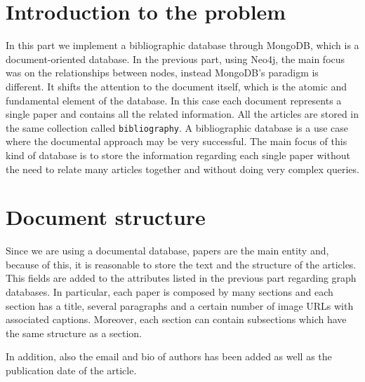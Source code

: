 \chapter{Introduction to the problem}
\label{ch:introduction_to_the_problem_mongodb}%
In this part we implement a bibliographic database through MongoDB, which is a document-oriented database.
In the previous part, using Neo4j, the main focus was on the relationships between nodes, instead MongoDB's paradigm is different.
It shifts the attention to the document itself, which is the atomic and fundamental element of the database.
In this case each document represents a single paper and contains all the related information.
All the articles are stored in the same collection called \verb|bibliography|.
A bibliographic database is a use case where the documental approach may be very successful.
The main focus of this kind of database is to store the information regarding each single paper without the need to relate many articles together and without doing very complex queries.


\chapter{Document structure}
\label{ch:document_structure}%
Since we are using a documental database, papers are the main entity and, because of this, it is reasonable to store the text and the structure of the articles.
This fields are added to the attributes listed in the previous part regarding graph databases.
In particular, each paper is composed by many sections and each section has a title, several paragraphs and a certain number of image URLs with associated captions.
Moreover, each section can contain subsections which have the same structure as a section.

In addition, also the email and bio of authors has been added as well as the publication date of the article.

